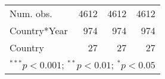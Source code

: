 \begin{table}[h!]
\begin{center}
\begin{tabular}{l@{} D{)}{)}{12)3}@{} D{)}{)}{9)3}@{} D{)}{)}{16)3}@{}}
Num. obs.                        & 4612                    & 4612                  & 4612                         \\
Country*Year                     & 974                     & 974                   & 974                          \\
Country                          & 27                      & 27                    & 27                           \\
\bottomrule
{}
\end{tabular}
\label{table:mlm_reg_table_partial}
\end{center}
\end{table}

